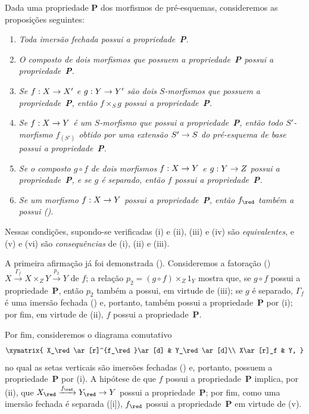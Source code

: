 \documentclass[oneside]{amsart}
\makeatletter
\newcommand{\ega@arrow}[2]{\mathchoice{#1}{#2}{#2}{#2}}
\renewcommand{\to}{\ega@arrow{\longrightarrow}{\rightarrow}}
\newcommand{\oldpage}[2][]{{\marginnote{\normalfont\textbf{#1}~|~#2}}\ignorespaces}
\let\EGAOriginalLabel\label
\renewcommand{\label}[1]{\phantomsection\EGAOriginalLabel{#1}}
\makeatother
\begin{document}
\begin{remark}[5.5.12]
\label{I.5.5.12}
Dada uma propriedade \textbf{P} dos morfismos de pré-esquemas, consideremos
as proposições seguintes:
\begin{enumerate}
  \item[\rm(i)] \emph{Toda imersão fechada possui a propriedade~\textbf{P}.}
  \item[\rm(ii)] \emph{O composto de dois morfismos que possuem a
    propriedade~\textbf{P} possui a propriedade~\textbf{P}.}
  \item[\rm(iii)] \emph{Se $f:X\to X'$ e $g:Y\to Y'$ são dois
    $S$-morfismos que possuem a propriedade~\textbf{P}, então
    $f\times_S g$ possui a propriedade~\textbf{P}.}

\oldpage[I]{140}
  \item[\rm(iv)] \emph{Se $f:X\to Y$ é um $S$-morfismo que possui a
    propriedade~\textbf{P}, então todo $S'$-morfismo $f_{(S')}$ obtido por
    uma extensão $S'\to S$ do pré-esquema de base possui a
    propriedade~\textbf{P}.}
  \item[\rm(v)] \emph{Se o composto $g\circ f$ de dois morfismos
    $f:X\to Y$ e $g:Y\to Z$ possui a propriedade~\textbf{P}, e se $g$ é
    separado, então $f$ possui a propriedade~\textbf{P}.}
  \item[\rm(vi)] \emph{Se um morfismo $f:X\to Y$ possui a
    propriedade~\textbf{P}, então $f_\red$ também a possui
    ().}
\end{enumerate}

Nessas condições, supondo-se verificadas (i) e (ii), (iii) e (iv) são
\emph{equivalentes}, e (v) e (vi) são \emph{consequências} de (i), (ii) e
(iii).

A primeira afirmação já foi demonstrada ().
Consideremos a fatoração ()
$X\xrightarrow{\Gamma_f}X\times_Z Y\xrightarrow{p_2}Y$ de $f$; a relação
$p_2=(g\circ f)\times_Z 1_Y$ mostra que, se $g\circ f$ possui a
propriedade~\textbf{P}, então $p_2$ também a possui, em virtude de (iii); se
$g$ é separado, $\Gamma_f$ é uma imersão fechada () e,
portanto, também possui a propriedade~\textbf{P} por (i); por fim, em virtude
de (ii), $f$ possui a propriedade~\textbf{P}.

Por fim, consideremos o diagrama comutativo
\[
  \xymatrix{
    X_\red\ar[r]^{f_\red}\ar[d] &
    Y_\red\ar[d]\\
    X\ar[r]_f &
    Y,
  }
\]
no qual as setas verticais são imersões fechadas () e,
portanto, possuem a propriedade~\textbf{P} por (i). A hipótese de que $f$
possui a propriedade~\textbf{P} implica, por (ii), que
$X_\red\xrightarrow{f_\red}Y_\red\to Y$ possui a propriedade~\textbf{P};
por fim, como uma imersão fechada é separada ([i]),
$f_\red$ possui a propriedade~\textbf{P} em virtude de (v).


\end{remark}
\end{document}
